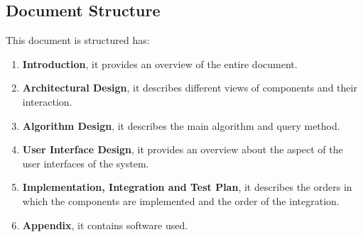 \subsection{Document Structure}
This document is structured has:
\begin{enumerate}
	\item \textbf{Introduction}, it provides an overview of the entire document.
	\item \textbf{Architectural Design}, it describes different views of components and their interaction.
		\item \textbf{Algorithm Design}, it describes the main algorithm and query method.
	\item \textbf{User Interface Design}, it provides an overview about the aspect of the user interfaces of the system.
	\item \textbf{Implementation, Integration and Test Plan}, it describes the orders in which the components are implemented and the order of the integration.
	\item \textbf{Appendix}, it contains software used.
\end{enumerate}




